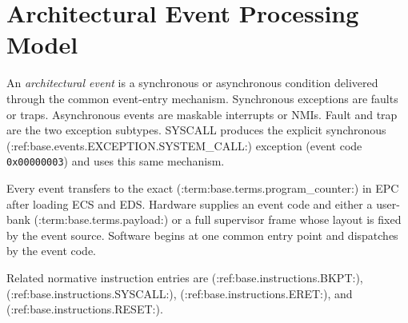 \clearpage
\section{Architectural Event Processing Model}\label{page:architectural-event-processing-model}

An \emph{architectural event} is a synchronous or asynchronous condition delivered through the common event-entry
mechanism. Synchronous exceptions are faults or traps. Asynchronous events are maskable interrupts or NMIs. Fault
and trap are the two exception subtypes. SYSCALL produces the explicit synchronous
(:ref:base.events.EXCEPTION.SYSTEM_CALL:) exception (event code \texttt{0x00000003}) and uses this same mechanism.

Every event transfers to the exact (:term:base.terms.program_counter:) in EPC after loading ECS and EDS. Hardware supplies an event code
and either a user-bank (:term:base.terms.payload:) or a full supervisor frame whose layout is fixed by the event source. Software begins at one
common entry point and dispatches by the event code.

Related normative instruction entries are
(:ref:base.instructions.BKPT:),
(:ref:base.instructions.SYSCALL:),
(:ref:base.instructions.ERET:), and
(:ref:base.instructions.RESET:).\par
